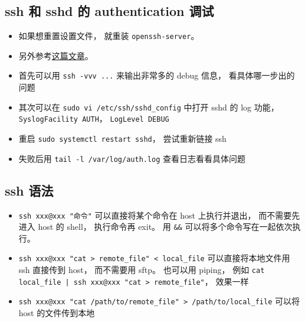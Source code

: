 \subsection{ssh 和 sshd 的 authentication 调试}
\begin{itemize}
\item 如果想重置设置文件， 就重装 \verb|openssh-server|。
\item 另外参考\href{https://medium.com/ci-cd-devops/ssh-receive-packet-type-51-154288e46609}{这篇文章}。
\item 首先可以用 \verb|ssh -vvv ...| 来输出非常多的 debug 信息， 看具体哪一步出的问题
\item 其次可以在 \verb|sudo vi /etc/ssh/sshd_config| 中打开 sshd 的 log 功能， \verb|SyslogFacility AUTH|， \verb|LogLevel DEBUG|
\item 重启 \verb`sudo systemctl restart sshd`， 尝试重新链接 ssh
\item 失败后用 \verb|tail -l /var/log/auth.log| 查看日志看看具体问题
\end{itemize}

\subsection{ssh 语法}
\begin{itemize}
\item \verb`ssh xxx@xxx "命令"` 可以直接将某个命令在 host 上执行并退出， 而不需要先进入 host 的 shell， 执行命令再 exit。 用 \verb`&&` 可以将多个命令写在一起依次执行。
\item \verb`ssh xxx@xxx "cat > remote_file" < local_file` 可以直接将本地文件用 ssh 直接传到 host， 而不需要用 sftp。 也可以用 piping， 例如 \verb`cat local_file | ssh xxx@xxx "cat > remote_file"`， 效果一样
\item \verb`ssh xxx@xxx "cat /path/to/remote_file" > /path/to/local_file` 可以将 host 的文件传到本地
\end{itemize}

